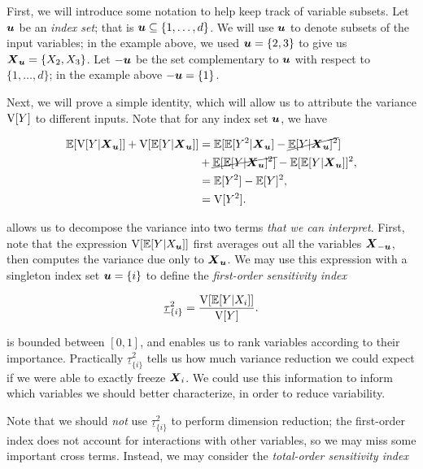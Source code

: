 \documentclass[../primer.tex]{subfiles}
\begin{document}
First, we will introduce some notation to help keep track of variable subsets.
Let \(\boldsymbol{u}\) be an \emph{index set}; that is \(\boldsymbol{u}\subseteq\{1,\dots,d\}\). We will use
\(\boldsymbol{u}\) to denote subsets of the input variables; in the example above, we used
\(\boldsymbol{u}=\{2,3\}\) to give us \(\boldsymbol{X}_{\boldsymbol{u}}=\{X_2,X_3\}\). Let \(-\boldsymbol{u}\) be the set
complementary to \(\boldsymbol{u}\) with respect to \(\{1,\dots,d\}\); in the example above
\(-\boldsymbol{u}=\{1\}\).

Next, we will prove a simple identity, which will allow us to attribute the
variance \(\mathrm{V}[Y]\) to different inputs. Note that for any index set \(\boldsymbol{u}\), we have

\begin{equation}\begin{aligned}\label{eq:var-decomp}
  \E[\V[Y|\mX_{\vu}]] + \V[\E[Y|\mX_{\vu}]] &= %
  \E[\E[Y^2|\mX_{\vu}] - \cancel{ \E[Y|\mX_{\vu}]^2 }] \\
  &+ \cancel{\E[\E[Y|\mX_{\vu}]^2]} - \E[\E[Y|\mX_{\vu}]]^2, \\
  &= \E[Y^2] - \E[Y]^2, \\
  &= \V[Y^2].
\end{aligned}\end{equation}

\noindent {} allows us to decompose the variance into two
terms \emph{that we can interpret}. First, note that the expression
\(\mathrm{V}[\mathbb{E}[Y|X_{\boldsymbol{u}}]]\) first averages out all the variables \(\boldsymbol{X}_{-\boldsymbol{u}}\), then
computes the variance due only to \(\boldsymbol{X}_{\boldsymbol{u}}\). We may use this expression with a
singleton index set \(\boldsymbol{u}=\{i\}\) to define the \emph{first-order sensitivity index}

\begin{equation}\label{eq:sobol-first}
  \underline{\tau}_{\{i\}}^2 = \frac{\mathrm{V}[\mathbb{E}[Y|X_i]]}{\mathrm{V}[Y]}.
\end{equation}

\noindent {} is bounded between \([0,1]\), and enables us to
rank variables according to their importance. Practically
\(\underline{\tau}_{\{i\}}^2\) tells us how much variance reduction we could
expect if we were able to exactly freeze \(\boldsymbol{X}_i\). We could use this information
to inform which variables we should better characterize, in order to reduce
variability.

Note that we should \emph{not} use \(\underline{\tau}_{\{i\}}^2\) to perform dimension
reduction; the first-order index does not account for interactions with other
variables, so we may miss some important cross terms. Instead, we may consider
the \emph{total-order sensitivity index}
\end{document}
